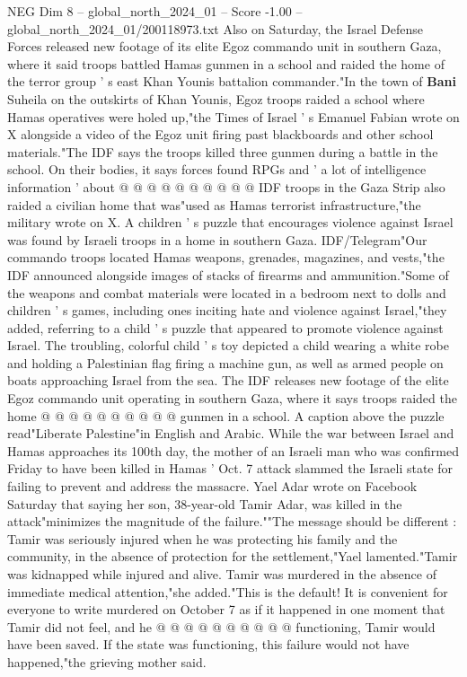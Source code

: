 \begin{textsample}{NEG Dim 8 – global\_north\_2024\_01 – Score -1.00 – global\_north\_2024\_01/200118973.txt}
Also on Saturday, the Israel Defense Forces released new footage of its elite Egoz commando unit in southern Gaza, where it said troops battled Hamas gunmen in a school and raided the home of the terror group ' s east Khan Younis battalion commander."In the town of \textbf{Bani} Suheila on the outskirts of Khan Younis, Egoz troops raided a school where Hamas operatives were holed up,"the Times of Israel ' s Emanuel Fabian wrote on X alongside a video of the Egoz unit firing past blackboards and other school materials."The IDF says the troops killed three gunmen during a battle in the school.
On their bodies, it says forces found RPGs and ' a lot of intelligence information ' about @ @ @ @ @ @ @ @ @ @ IDF troops in the Gaza Strip also raided a civilian home that was"used as Hamas terrorist infrastructure,"the military wrote on X.
A children ' s puzzle that encourages violence against Israel was found by Israeli troops in a home in southern Gaza.
IDF/Telegram"Our commando troops located Hamas weapons, grenades, magazines, and vests,"the IDF announced alongside images of stacks of firearms and ammunition."Some of the weapons and combat materials were located in a bedroom next to dolls and children ' s games, including ones inciting hate and violence against Israel,"they added, referring to a child ' s puzzle that appeared to promote violence against Israel.
The troubling, colorful child ' s toy depicted a child wearing a white robe and holding a Palestinian flag firing a machine gun, as well as armed people on boats approaching Israel from the sea.
The IDF releases new footage of the elite Egoz commando unit operating in southern Gaza, where it says troops raided the home @ @ @ @ @ @ @ @ @ @ gunmen in a school.
A caption above the puzzle read"Liberate Palestine"in English and Arabic.
While the war between Israel and Hamas approaches its 100th day, the mother of an Israeli man who was confirmed Friday to have been killed in Hamas ' Oct. 7 attack slammed the Israeli state for failing to prevent and address the massacre.
Yael Adar wrote on Facebook Saturday that saying her son, 38-year-old Tamir Adar, was killed in the attack"minimizes the magnitude of the failure.""The message should be different : Tamir was seriously injured when he was protecting his family and the community, in the absence of protection for the settlement,"Yael lamented."Tamir was kidnapped while injured and alive.
Tamir was murdered in the absence of immediate medical attention,"she added."This is the default!
It is convenient for everyone to write murdered on October 7 as if it happened in one moment that Tamir did not feel, and he @ @ @ @ @ @ @ @ @ @ functioning, Tamir would have been saved.
If the state was functioning, this failure would not have happened,"the grieving mother said.

\end{textsample}

